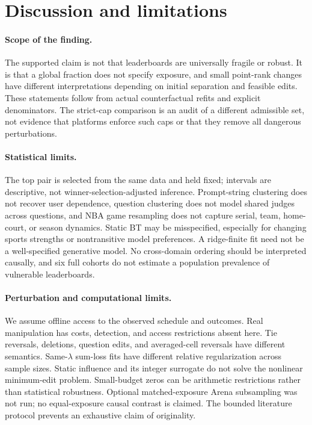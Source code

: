 \documentclass{article}
\begin{document}
\section{Discussion and limitations}\label{sec:limits}
\paragraph{Scope of the finding.}
The supported claim is not that leaderboards are universally fragile or robust. It is that a global fraction does not specify exposure, and small point-rank changes have different interpretations depending on initial separation and feasible edits. These statements follow from actual counterfactual refits and explicit denominators. The strict-cap comparison is an audit of a different admissible set, not evidence that platforms enforce such caps or that they remove all dangerous perturbations.

\paragraph{Statistical limits.}
The top pair is selected from the same data and held fixed; intervals are descriptive, not winner-selection-adjusted inference. Prompt-string clustering does not recover user dependence, question clustering does not model shared judges across questions, and NBA game resampling does not capture serial, team, home-court, or season dynamics. Static BT may be misspecified, especially for changing sports strengths or nontransitive model preferences. A ridge-finite fit need not be a well-specified generative model. No cross-domain ordering should be interpreted causally, and six full cohorts do not estimate a population prevalence of vulnerable leaderboards.

\paragraph{Perturbation and computational limits.}
We assume offline access to the observed schedule and outcomes. Real manipulation has costs, detection, and access restrictions absent here. Tie reversals, deletions, question edits, and averaged-cell reversals have different semantics. Same-$\lambda$ sum-loss fits have different relative regularization across sample sizes. Static influence and its integer surrogate do not solve the nonlinear minimum-edit problem. Small-budget zeros can be arithmetic restrictions rather than statistical robustness. Optional matched-exposure Arena subsampling was not run; no equal-exposure causal contrast is claimed. The bounded literature protocol prevents an exhaustive claim of originality.
\end{document}
